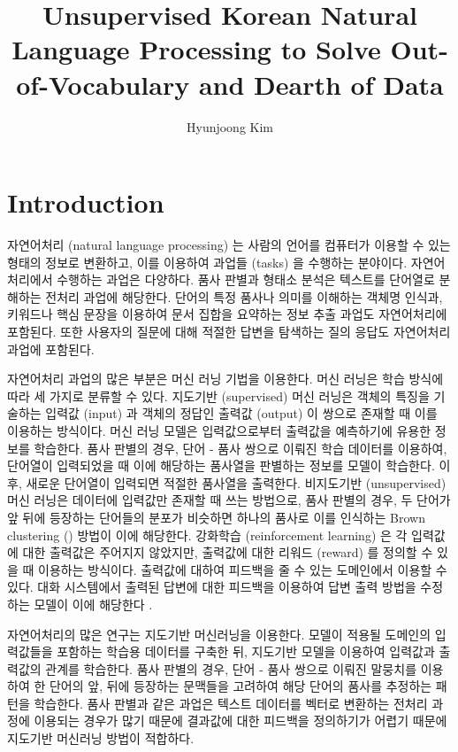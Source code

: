\documentclass[11pt]{article}
\begin{document}
\title{Unsupervised Korean Natural Language Processing to Solve Out-of-Vocabulary and Dearth of Data}
\author{Hyunjoong Kim}

\maketitle
\smallskip

\section{Introduction}

자연어처리 (natural language processing) 는 사람의 언어를 컴퓨터가 이용할 수 있는 형태의 정보로 변환하고, 이를 이용하여 과업들 (tasks) 을 수행하는 분야이다.
자연어처리에서 수행하는 과업은 다양하다.
품사 판별과 형태소 분석은 텍스트를 단어열로 분해하는 전처리 과업에 해당한다.
단어의 특정 품사나 의미를 이해하는 객체명 인식과, 키워드나 핵심 문장을 이용하여 문서 집합을 요약하는 정보 추출 과업도 자연어처리에 포함된다.
또한 사용자의 질문에 대해 적절한 답변을 탐색하는 질의 응답도 자연어처리 과업에 포함된다.

자연어처리 과업의 많은 부분은 머신 러닝 기법을 이용한다.
머신 러닝은 학습 방식에 따라 세 가지로 분류할 수 있다.
지도기반 (supervised) 머신 러닝은 객체의 특징을 기술하는 입력값 (input) 과 객체의 정답인 출력값 (output) 이 쌍으로 존재할 때 이를 이용하는 방식이다.
머신 러닝 모델은 입력값으로부터 출력값을 예측하기에 유용한 정보를 학습한다.
품사 판별의 경우, 단어 - 품사 쌍으로 이뤄진 학습 데이터를 이용하여, 단어열이 입력되었을 때 이에 해당하는 품사열을 판별하는 정보를 모델이 학습한다.
이후, 새로운 단어열이 입력되면 적절한 품사열을 출력한다.
비지도기반 (unsupervised) 머신 러닝은 데이터에 입력값만 존재할 때 쓰는 방법으로, 품사 판별의 경우, 두 단어가 앞 뒤에 등장하는 단어들의 분포가 비슷하면 하나의 품사로 이를 인식하는 Brown clustering (\citep{brown1992class}) 방법이 이에 해당한다.
강화학습 (reinforcement learning) 은 각 입력값에 대한 출력값은 주어지지 않았지만, 출력값에 대한 리워드 (reward) 를 정의할 수 있을 때 이용하는 방식이다.
출력값에 대하여 피드백을 줄 수 있는 도메인에서 이용할 수 있다.
대화 시스템에서 출력된 답변에 대한 피드백을 이용하여 답변 출력 방법을 수정하는 모델이 이에 해당한다 \citep{mo2018personalizing, singh2000reinforcement, li2016deep}. 

자연어처리의 많은 연구는 지도기반 머신러닝을 이용한다.
모델이 적용될 도메인의 입력값들을 포함하는 학습용 데이터를 구축한 뒤, 지도기반 모델을 이용하여 입력값과 출력값의 관계를 학습한다.
품사 판별의 경우, 단어 - 품사 쌍으로 이뤄진 말뭉치를 이용하여 한 단어의 앞, 뒤에 등장하는 문맥들을 고려하여 해당 단어의 품사를 추정하는 패턴을 학습한다.
품사 판별과 같은 과업은 텍스트 데이터를 벡터로 변환하는 전처리 과정에 이용되는 경우가 많기 때문에 결과값에 대한 피드백을 정의하기가 어렵기 때문에 지도기반 머신러닝 방법이 적합하다.
\end{document}
